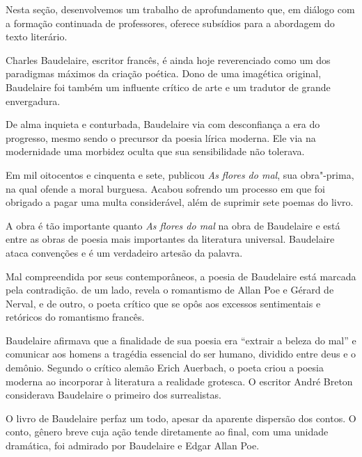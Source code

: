 \documentclass[12pt]{extarticle}
\begin{document}
Nesta seção, desenvolvemos um trabalho de aprofundamento que, em diálogo
com a formação continuada de professores, oferece subsídios para a
abordagem do texto literário.

Charles Baudelaire, escritor francês, é ainda hoje reverenciado como
um dos paradigmas máximos da criação poética.
Dono de uma imagética original, Baudelaire foi também um influente
crítico de arte e um tradutor de grande envergadura.




De alma inquieta e conturbada, Baudelaire via com desconfiança a era do
progresso, mesmo sendo o precursor da poesia lírica moderna.
Ele via na modernidade uma morbidez oculta que sua sensibilidade não
tolerava.


 

Em mil oitocentos e cinquenta e sete, publicou \textit{As flores do mal},
sua obra"-prima, na qual ofende a moral burguesa. Acabou sofrendo um
processo em que foi obrigado a pagar uma multa considerável, além de
suprimir sete poemas do livro.

A obra é tão importante quanto \textit{As flores do mal} na obra de
Baudelaire e está entre as obras de poesia mais importantes da
literatura universal.
Baudelaire ataca convenções e é um verdadeiro artesão da palavra.

Mal compreendida por seus contemporâneos, a poesia de Baudelaire está
marcada pela contradição. de um lado, revela o romantismo de Allan Poe e
Gérard de Nerval, e de outro, o poeta crítico que se opôs aos excessos
sentimentais e retóricos do romantismo francês.

Baudelaire afirmava que a finalidade de sua poesia era ``extrair a
beleza do mal'' e comunicar aos homens a tragédia essencial do ser
humano, dividido entre deus e o demônio.
Segundo o crítico alemão Erich Auerbach, o poeta criou a poesia moderna
ao incorporar à literatura a realidade grotesca. O escritor André Breton
considerava Baudelaire o primeiro dos surrealistas.




O livro de Baudelaire perfaz um todo, apesar da aparente dispersão dos
contos.
O conto, gênero breve cuja ação tende diretamente ao final, com uma
unidade dramática, foi admirado por Baudelaire e Edgar Allan Poe.
\end{document}
